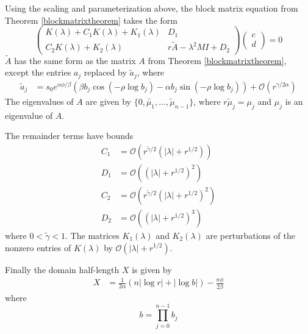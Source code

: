 \documentclass[thesis.tex]{subfiles}
\begin{document}
\begin{lemma}\label{reparam}
Using the scaling and parameterization above, the block matrix equation from Theorem \ref{blockmatrixtheorem} takes the form
\begin{equation}\label{blockeq2}
\begin{pmatrix}
K(\lambda) + C_1 K(\lambda) + K_1(\lambda) & D_1 \\
C_2 K(\lambda) + K_2(\lambda) & r \tilde{A} - \lambda^2 MI + D_2
\end{pmatrix}
\begin{pmatrix}c \\ d \end{pmatrix} 
= 0
\end{equation}
$\tilde{A}$ has the same form as the matrix $A$ from Theorem \ref{blockmatrixtheorem}, except the entries $a_j$ replaced by $\tilde{a}_j$, where
\begin{align}\label{tildea}
\tilde{a}_j 
&= s_0 e^{\alpha \phi/\beta} \left( \beta b_j \cos\left( -\rho \log b_j \right) - \alpha b_j \sin \left( -\rho \log b_j  \right) \right) + \mathcal{O}(r^{\gamma/2\alpha})
\end{align}
The eigenvalues of $A$ are given by $\{0, \tilde{\mu_1}, \dots, \tilde{\mu}_{n-1} \}$, where $r \tilde{\mu}_j = \mu_j$ and $\mu_j$ is an eigenvalue of $A$.

The remainder terms have bounds
\begin{align*}
C_1 &= \mathcal{O}\left(r^{\tilde{\gamma}/2}(|\lambda| + r^{1/2})\right) \\
D_1 &= \mathcal{O}\left((|\lambda| + r^{1/2})^2\right) \\
C_2 &= \mathcal{O}\left(r^{\tilde{\gamma}/2}(|\lambda| + r^{1/2})^2\right) \\
D_2 &= \mathcal{O}\left((|\lambda| + r^{1/2})^3\right)
\end{align*}
where $0 < \tilde{\gamma} < 1$. The matrices $K_1(\lambda)$ and $K_2(\lambda)$ are perturbations of the nonzero entries of $K(\lambda)$ by $\mathcal{O}(|\lambda| + r^{1/2})$.

Finally the domain half-length $X$ is given by
\begin{align}\label{Xscaled}
X &= \frac{1}{2\alpha} (n |\log r| + |\log b| ) - \frac{n \phi}{2 \beta}
\end{align}
where 
\begin{equation}\label{defb}
b = \prod_{j=0}^{n-1} b_j
\end{equation}


\end{lemma}
\end{document}
